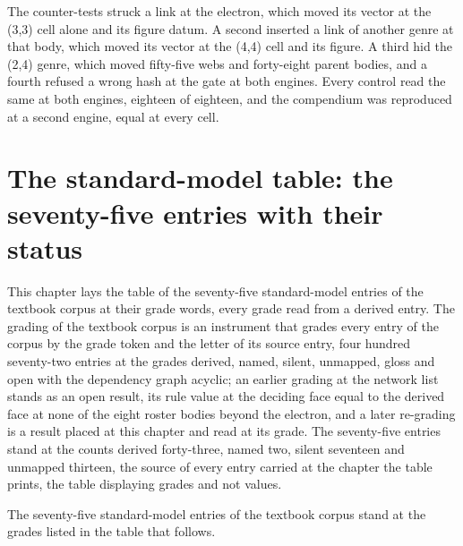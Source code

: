 \begin{chproof}[instrument]
The counter-tests struck a link at the electron, which moved its vector at the (3,3) cell alone and its figure datum. A second inserted a link of another genre at that body, which moved its vector at the (4,4) cell and its figure. A third hid the (2,4) genre, which moved fifty-five webs and forty-eight parent bodies, and a fourth refused a wrong hash at the gate at both engines. Every control read the same at both engines, eighteen of eighteen, and the compendium was reproduced at a second engine, equal at every cell.
\end{chproof}

\section{The standard-model table: the seventy-five entries with their status}\label{mod:IV-10-sm-table-the-75-entries-with-their-status}
\begin{chtable}
This chapter lays the table of the seventy-five standard-model entries of the textbook corpus at their grade words, every grade read from a derived entry. The grading of the textbook corpus is an instrument that grades every entry of the corpus by the grade token and the letter of its source entry, four hundred seventy-two entries at the grades derived, named, silent, unmapped, gloss and open with the dependency graph acyclic; an earlier grading at the network list stands as an open result, its rule value at the deciding face equal to the derived face at none of the eight roster bodies beyond the electron, and a later re-grading is a result placed at this chapter and read at its grade. The seventy-five entries stand at the counts derived forty-three, named two, silent seventeen and unmapped thirteen, the source of every entry carried at the chapter the table prints, the table displaying grades and not values.
\end{chtable}
\chdeps{}{}
\begin{chtheorem}The seventy-five standard-model entries of the textbook corpus stand at the grades listed in the table that follows.\end{chtheorem}
